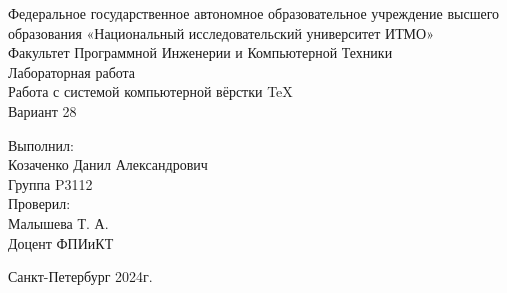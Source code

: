 \begingroup
    \fontsize{12}{18}\selectfont
    \begin{center}
        Федеральное государственное автономное образовательное учреждение высшего образования «Национальный исследовательский университет ИТМО»\\
        \vspace{1em}
        Факультет Программной Инженерии и Компьютерной Техники\\
        \vspace{20em}
        Лабораторная работа \\
        Работа с системой компьютерной вёрстки \TeX \\
        Вариант 28
    \end{center}
    
    \vspace{\fill}
    \begin{flushright}
        Выполнил:\\
        Козаченко Данил Александрович\\
        Группа P3112\\
        Проверил:\\
        Малышева Т. А.\\
        Доцент ФПИиКТ\\
    \end{flushright}
    
    \begin{center}
    Санкт-Петербург
    2024г.
    \end{center}
\endgroup